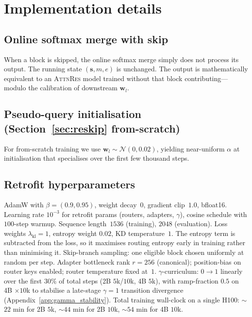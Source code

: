 \documentclass{article}
\newcommand{\attnres}{\textsc{AttnRes}}
\begin{document}
\section{Implementation details}
\label{app:implementation}

\subsection{Online softmax merge with skip}
When a block is skipped, the online softmax merge simply does not process its output. The running state $(\mathbf{s}, m, e)$ is unchanged. The output is mathematically equivalent to an \attnres{} model trained without that block contributing---modulo the calibration of downstream $\mathbf{w}_l$.

\subsection{Pseudo-query initialisation (Section~\ref{sec:reskip} from-scratch)}
For from-scratch training we use $\mathbf{w}_l \sim \mathcal{N}(0, 0.02)$, yielding near-uniform $\alpha$ at initialisation that specialises over the first few thousand steps.

\subsection{Retrofit hyperparameters}
\label{app:retrofit_hparams}
AdamW with $\beta{=}(0.9,0.95)$, weight decay~$0$, gradient clip~$1.0$, bfloat16. Learning rate $10^{-3}$ for retrofit params (routers, adapters, $\gamma$), cosine schedule with $100$-step warmup. Sequence length~$1536$ (training), $2048$ (evaluation). Loss weights $\lambda_{\text{kl}}{=}1$, entropy weight $0.02$, KD temperature~$1$. The entropy term is subtracted from the loss, so it maximises routing entropy early in training rather than minimising it. Skip-branch sampling: one eligible block chosen uniformly at random per step. Adapter bottleneck rank $r{=}256$ (canonical); position-bias on router keys enabled; router temperature fixed at~$1$. $\gamma$-curriculum: $0\to 1$ linearly over the first $30\%$ of total steps (2B $5$k/$10$k, 4B $5$k), with ramp-fraction $0.5$ on 4B $\times 10$k to stabilise a late-stage $\gamma{=}1$ transition divergence (Appendix~\ref{app:gamma_stability}). Total training wall-clock on a single H100: $\sim$$22$ min for 2B $5$k, $\sim$$44$ min for 2B $10$k, $\sim$$54$ min for 4B $10$k.
\end{document}
